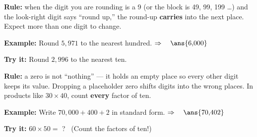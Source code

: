 \documentclass[12pt]{article}
\begin{document}


\begin{formulabox}
\textbf{Rule:} when the digit you are rounding is a 9 (or the block is 49, 99,
199 \ldots) and the look-right digit says ``round up,'' the round-up
\textbf{carries} into the next place. Expect more than one digit to change.
\end{formulabox}

\begin{examplebox}
\textbf{Example:} \quad Round $5{,}971$ to the nearest hundred.
$\Rightarrow\quad \ans{6{,}000}$
\end{examplebox}

\begin{tryitbox}
\textbf{Try it:} \quad Round $2{,}996$ to the nearest ten.\\[2pt]
\end{tryitbox}


\begin{formulabox}
\textbf{Rule:} a zero is not ``nothing'' --- it holds an empty place so every
other digit keeps its value. Dropping a placeholder zero shifts digits into the
wrong places. In products like $30 \times 40$, count \textbf{every} factor of
ten.
\end{formulabox}

\begin{examplebox}
\textbf{Example:} \quad Write $70{,}000 + 400 + 2$ in standard form.
$\Rightarrow\quad \ans{70{,}402}$
\end{examplebox}

\begin{tryitbox}
\textbf{Try it:} \quad $60 \times 50 = $ ? \ (Count the factors of ten!)\\[2pt]
\end{tryitbox}

\end{document}
